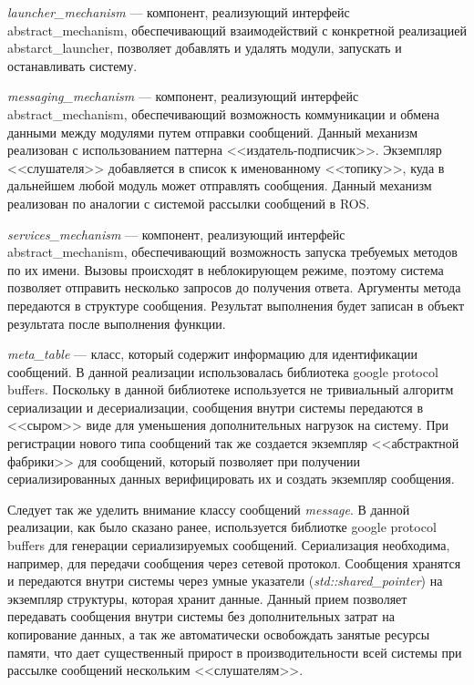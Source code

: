 \textit{launcher\_mechanism} --- компонент, реализующий интерфейс abstract\_mechanism, обеспечивающий взаимодействий с конкретной реализацией abstarct\_launcher, позволяет добавлять и удалять модули, запускать и останавливать систему.

\textit{messaging\_mechanism} --- компонент, реализующий интерфейс abstract\_mechanism, обеспечивающий возможность коммуникации и обмена данными между модулями путем отправки сообщений. Данный механизм реализован с использованием паттерна <<издатель-подписчик>>. Экземпляр <<слушателя>> добавляется в список к именованному <<топику>>, куда в дальнейшем любой модуль может отправлять сообщения. Данный механизм реализован по аналогии с системой рассылки сообщений в ROS.

\textit{services\_mechanism} --- компонент, реализующий 
интерфейс abstract\_mechanism, обеспечивающий возможность 
запуска требуемых методов по их имени. Вызовы происходят в 
неблокирующем режиме, поэтому система позволяет отправить 
несколько запросов до получения ответа. Аргументы метода 
передаются в структуре сообщения. Результат выполнения будет 
записан в объект результата после выполнения функции. 

\textit{meta\_table} --- класс, который содержит информацию для идентификации сообщений. В данной реализации использовалась библиотека google protocol buffers. Поскольку в данной библиотеке используется не тривиальный алгоритм сериализации и десериализации, сообщения внутри системы передаются в <<сыром>> виде для уменьшения дополнительных нагрузок на систему. При регистрации нового типа сообщений так же создается экземпляр <<абстрактной фабрики>> для сообщений, который позволяет при получении сериализированных данных верифицировать их и создать экземпляр сообщения.

Следует так же уделить внимание классу сообщений 
\textit{message}. В данной реализации, как было сказано ранее, 
используется библиотке google protocol buffers для генерации 
сериализируемых сообщений. Сериализация необходима, например, 
для передачи сообщения через сетевой протокол. Сообщения 
хранятся и передаются внутри системы через умные указатели 
(\textit{std::shared\_pointer}) на экземпляр структуры, которая 
хранит данные. Данный прием позволяет передавать сообщения 
внутри системы без дополнительных затрат на копирование данных, 
а так же автоматически освобождать занятые ресурсы памяти, что 
дает существенный прирост в производительности всей системы при 
рассылке сообщений нескольким <<слушателям>>.

